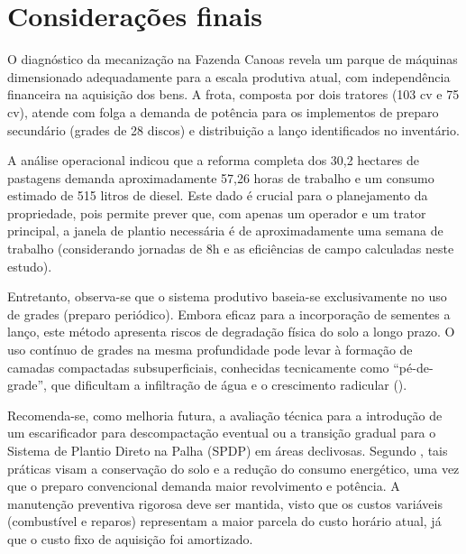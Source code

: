 \documentclass[12pt,openright,oneside,a4paper,hidelinks,espacamento=1.5]{abntex2}
\begin{document}
\chapter{Considerações finais}

O diagnóstico da mecanização na Fazenda Canoas revela um parque de máquinas dimensionado adequadamente para a escala produtiva atual, com independência financeira na aquisição dos bens. A frota, composta por dois tratores (103 cv e 75 cv), atende com folga a demanda de potência para os implementos de preparo secundário (grades de 28 discos) e distribuição a lanço identificados no inventário.

A análise operacional indicou que a reforma completa dos 30,2 hectares de pastagens demanda aproximadamente 57,26 horas de trabalho e um consumo estimado de 515 litros de diesel. Este dado é crucial para o planejamento da propriedade, pois permite prever que, com apenas um operador e um trator principal, a janela de plantio necessária é de aproximadamente uma semana de trabalho (considerando jornadas de 8h e as eficiências de campo calculadas neste estudo).

Entretanto, observa-se que o sistema produtivo baseia-se exclusivamente no uso de grades (preparo periódico). Embora eficaz para a incorporação de sementes a lanço, este método apresenta riscos de degradação física do solo a longo prazo. O uso contínuo de grades na mesma profundidade pode levar à formação de camadas compactadas subsuperficiais, conhecidas tecnicamente como ``pé-de-grade'', que dificultam a infiltração de água e o crescimento radicular ().

Recomenda-se, como melhoria futura, a avaliação técnica para a introdução de um escarificador para descompactação eventual ou a transição gradual para o Sistema de Plantio Direto na Palha (SPDP) em áreas declivosas. Segundo , tais práticas visam a conservação do solo e a redução do consumo energético, uma vez que o preparo convencional demanda maior revolvimento e potência. A manutenção preventiva rigorosa deve ser mantida, visto que os custos variáveis (combustível e reparos) representam a maior parcela do custo horário atual, já que o custo fixo de aquisição foi amortizado.



\end{document}
